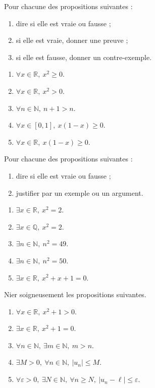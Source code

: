 \documentclass[11pt,a4paper]{article}
\newcommand{\N}{\mathbb{N}}
\newcommand{\Q}{\mathbb{Q}}
\newcommand{\R}{\mathbb{R}}
\newcommand{\eps}{\varepsilon}
\begin{document}
\begin{exercicebox}
Pour chacune des propositions suivantes :

\begin{enumerate}
    \item dire si elle est vraie ou fausse ;
    \item si elle est vraie, donner une preuve ;
    \item si elle est fausse, donner un contre-exemple.
\end{enumerate}

\begin{enumerate}[label=\alph*)]
    \item \(\forall x\in\R,\ x^2\geq0\).
    \item \(\forall x\in\R,\ x^2>0\).
    \item \(\forall n\in\N,\ n+1>n\).
    \item \(\forall x\in[0,1],\ x(1-x)\geq0\).
    \item \(\forall x\in\R,\ x(1-x)\geq0\).
\end{enumerate}
\end{exercicebox}

\begin{exercicebox}
Pour chacune des propositions suivantes :

\begin{enumerate}[label=\alph*)]
    \item dire si elle est vraie ou fausse ;
    \item justifier par un exemple ou un argument.
\end{enumerate}

\begin{enumerate}
    \item \(\exists x\in\R,\ x^2=2\).
    \item \(\exists x\in\Q,\ x^2=2\).
    \item \(\exists n\in\N,\ n^2=49\).
    \item \(\exists n\in\N,\ n^2=50\).
    \item \(\exists x\in\R,\ x^2+x+1=0\).
\end{enumerate}
\end{exercicebox}

\begin{exercicebox}
Nier soigneusement les propositions suivantes.

\begin{enumerate}[label=\alph*)]
    \item \(\forall x\in\R,\ x^2+1>0\).
    \item \(\exists x\in\R,\ x^2+1=0\).
    \item \(\forall n\in\N,\ \exists m\in\N,\ m>n\).
    \item \(\exists M>0,\ \forall n\in\N,\ |u_n|\leq M\).
    \item \(\forall \eps>0,\ \exists N\in\N,\ \forall n\geq N,\ |u_n-\ell|\leq \eps\).
\end{enumerate}
\end{exercicebox}
\end{document}
